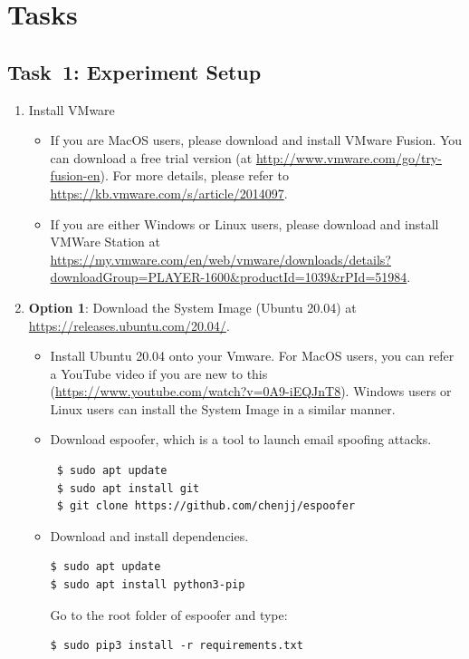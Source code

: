 \documentclass[11pt]{article}
\newcommand{\espoofer}{{\sf espoofer}\xspace}
\begin{document}
\section{Tasks}

\subsection{Task~1: Experiment Setup}



\begin{enumerate}
\item Install VMware
\begin{itemize}
    \item If you are MacOS users, please download and install VMware Fusion. You can  download a free trial version (at \url{http://www.vmware.com/go/try-fusion-en}). For more details, please refer to \url{https://kb.vmware.com/s/article/2014097}.
    \item If you are either Windows or Linux users, please download and install VMWare Station at \url{https://my.vmware.com/en/web/vmware/downloads/details?downloadGroup=PLAYER-1600&productId=1039&rPId=51984}.

\end{itemize}
\item\textbf{Option 1}: Download the System Image (Ubuntu 20.04) at \url{https://releases.ubuntu.com/20.04/}.

\begin{itemize}
\item Install Ubuntu 20.04 onto your Vmware. For MacOS users, you can refer a YouTube video if you are new to this (\url{https://www.youtube.com/watch?v=0A9-iEQJnT8}). Windows users or Linux users can install the System Image in a similar manner.
\item Download \espoofer, which is a tool to launch email spoofing attacks.
\begin{lstlisting}
 $ sudo apt update
 $ sudo apt install git
 $ git clone https://github.com/chenjj/espoofer
\end{lstlisting}\vspace{-6mm}

\item Download and install dependencies.
\begin{lstlisting}
$ sudo apt update
$ sudo apt install python3-pip
\end{lstlisting}\vspace{-6mm}
Go to the root folder of \espoofer and type:
 \begin{lstlisting}
$ sudo pip3 install -r requirements.txt
\end{lstlisting}\vspace{-6mm}
\end{itemize}




\end{enumerate}
\end{document}
